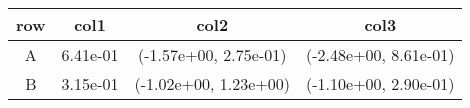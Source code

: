 \begin{tabular}{cccc}
\toprule
row&col1&col2&col3\tabularnewline
\midrule
A&6.41e-01& (-1.57e+00, 2.75e-01)& (-2.48e+00, 8.61e-01)\tabularnewline
B&3.15e-01& (-1.02e+00, 1.23e+00)& (-1.10e+00, 2.90e-01)\tabularnewline
\bottomrule
\end{tabular}
